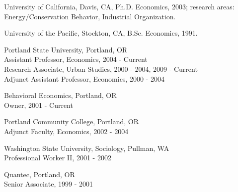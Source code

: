 \documentclass[Computer Science]{vita}
\begin{document}

  

\begin{vita}

  \begin{Degrees}
  \item University of California, Davis, CA, Ph.D. Economics, 2003;
    research areas: Energy/Conservation Behavior, Industrial
    Organization.

  \item University of the Pacific, Stockton, CA, B.Sc. Economics,
    1991.
  \end{Degrees}

  \begin{Experience}
	
  \item Portland State University,  Portland, OR\\
    Assistant Professor, Economics, 2004 - Current\\
    Research Associate, Urban Studies, 2000 - 2004, 2009 - Current\\
    Adjunct Assistant Professor, Economics, 2000 - 2004
	
  \item Behavioral Economics, Portland, OR\\
    Owner, 2001 - Current
		
  \item Portland Community College, Portland, OR\\
    Adjunct Faculty, Economics, 2002 - 2004
	
  \item Washington State University, Sociology, Pullman, WA\\
    Professional Worker II, 2001 - 2002
	
  \item Quantec, Portland, OR\\
    Senior Associate, 1999 - 2001
	

\end{Experience}
\end{vita}
\end{document}
